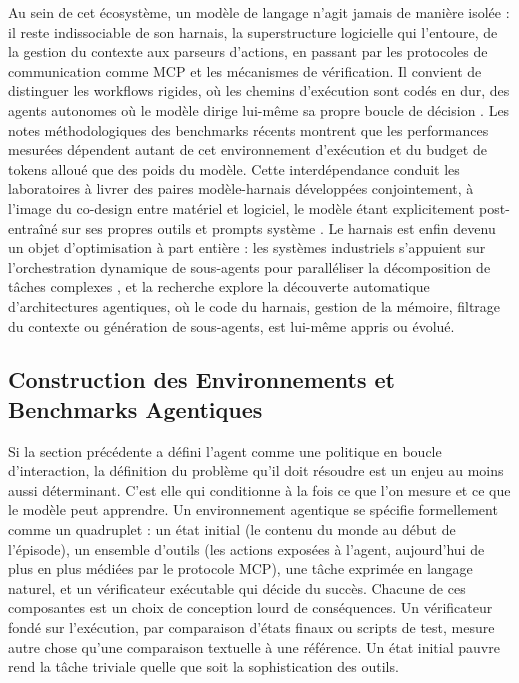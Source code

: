 \documentclass[11pt,a4paper]{article}
\begin{document}
Au sein de cet écosystème, un modèle de langage n'agit jamais de manière isolée : il reste indissociable de son harnais, la superstructure logicielle qui l'entoure, de la gestion du contexte aux parseurs d'actions, en passant par les protocoles de communication comme MCP \cite{anthropic2024mcp} et les mécanismes de vérification. Il convient de distinguer les workflows rigides, où les chemins d'exécution sont codés en dur, des agents autonomes où le modèle dirige lui-même sa propre boucle de décision \cite{anthropic2024agents}. Les notes méthodologiques des benchmarks récents montrent que les performances mesurées dépendent autant de cet environnement d'exécution et du budget de tokens alloué que des poids du modèle. Cette interdépendance conduit les laboratoires à livrer des paires modèle-harnais développées conjointement, à l'image du co-design entre matériel et logiciel, le modèle étant explicitement post-entraîné sur ses propres outils et prompts système \cite{anthropic2024agents, kimik2_2025}. Le harnais est enfin devenu un objet d'optimisation à part entière : les systèmes industriels s'appuient sur l'orchestration dynamique de sous-agents pour paralléliser la décomposition de tâches complexes \cite{kimik2_2025}, et la recherche explore la découverte automatique d'architectures agentiques, où le code du harnais, gestion de la mémoire, filtrage du contexte ou génération de sous-agents, est lui-même appris ou évolué.

\subsection{Construction des Environnements et Benchmarks Agentiques}

Si la section précédente a défini l'agent comme une politique en boucle d'interaction, la définition du problème qu'il doit résoudre est un enjeu au moins aussi déterminant. C'est elle qui conditionne à la fois ce que l'on mesure et ce que le modèle peut apprendre. Un environnement agentique se spécifie formellement comme un quadruplet : un état initial (le contenu du monde au début de l'épisode), un ensemble d'outils (les actions exposées à l'agent, aujourd'hui de plus en plus médiées par le protocole MCP), une tâche exprimée en langage naturel, et un vérificateur exécutable qui décide du succès. Chacune de ces composantes est un choix de conception lourd de conséquences. Un vérificateur fondé sur l'exécution, par comparaison d'états finaux ou scripts de test, mesure autre chose qu'une comparaison textuelle à une référence. Un état initial pauvre rend la tâche triviale quelle que soit la sophistication des outils.
\end{document}
